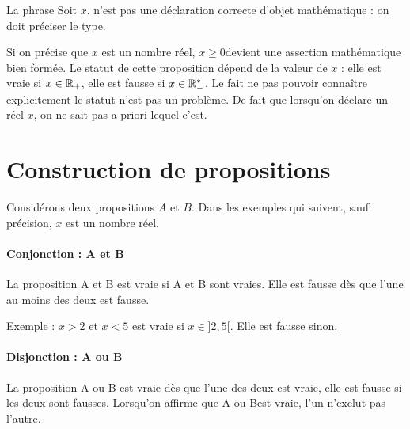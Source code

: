 La phrase \og Soit $x$.\fg{} n'est pas une déclaration correcte  d'objet mathématique : on doit préciser le type.

Si on précise que $x$ est un nombre réel, \og$x\geq 0$\fg devient une assertion mathématique bien formée. Le statut de cette proposition dépend de la valeur de $x$ : elle est vraie si $x\in \mathbb{R}_+$, elle est fausse si $x\in \mathbb{R}_-^*$. Le fait ne pas pouvoir connaître explicitement le statut n'est pas un problème. De fait que lorsqu'on déclare un réel $x$, on ne sait pas a priori lequel c'est.



\section{Construction de propositions}

Considérons deux propositions $A$ et $B$. Dans les exemples qui suivent, sauf précision, $x$ est un nombre réel.

\paragraph{Conjonction : \og A et B\fg} 

La proposition \og A et B \fg{} est vraie si A et B sont vraies. Elle est fausse dès que l'une au moins des deux est fausse.

Exemple : \og$x>2$ et $x<5$\fg{} est vraie si $x\in]2,5[$. Elle est fausse sinon.

\paragraph{Disjonction : \og A ou B\fg} 

La proposition  \og A ou B\fg{} est vraie dès que l'une des deux est vraie, elle est fausse si les deux sont fausses. Lorsqu'on affirme que \og A ou B\fg est vraie, l'un n'exclut pas l'autre.


